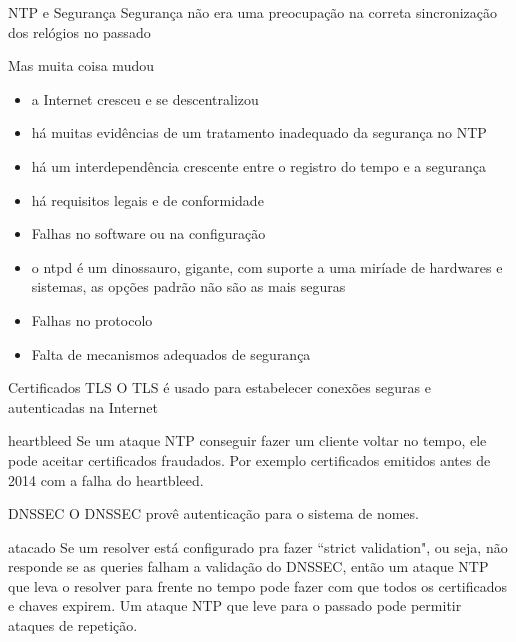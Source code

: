 \documentclass{if-beamer}
\begin{document}
	\begin{frame}[allowframebreaks]{NTP e Segurança}
		Segurança não era uma preocupação na correta sincronização dos relógios no passado
		\begin{block}{Mas muita coisa mudou}
			\begin{itemize}
				\item a Internet cresceu e se descentralizou
				\item há muitas evidências de um tratamento inadequado da segurança no NTP
				\item há um interdependência crescente entre o registro do tempo e a segurança
				\item há requisitos legais e de conformidade
			\end{itemize}
		\end{block}
		\framebreak
	\begin{itemize}	
		\item Falhas no software ou na configuração
		\item o ntpd é um dinossauro, gigante, com suporte a uma miríade de hardwares e sistemas, as opções padrão não são as mais seguras
		\item Falhas no protocolo
		\item Falta de mecanismos adequados de segurança
	\end{itemize}
	\end{frame}


	\begin{frame}{Certificados TLS}
	O TLS é usado para estabelecer conexões seguras e autenticadas na Internet
	\begin{block}{heartbleed}
	Se um ataque NTP conseguir fazer um cliente voltar no tempo, ele pode aceitar certificados fraudados. Por exemplo certificados emitidos antes de 2014 com a falha do heartbleed.
	\end{block}
	\end{frame}

	\begin{frame}{DNSSEC}
	O DNSSEC provê autenticação para o sistema de nomes. 
	\begin{block}{atacado}
	Se um resolver está configurado pra fazer ``strict validation", ou seja, não responde se as queries falham a validação do DNSSEC, então um ataque NTP que leva o resolver para frente no tempo pode fazer com que todos os certificados e chaves expirem. Um ataque NTP que leve para o passado pode permitir ataques de repetição.
	\end{block}

	\end{frame}
\end{document}
